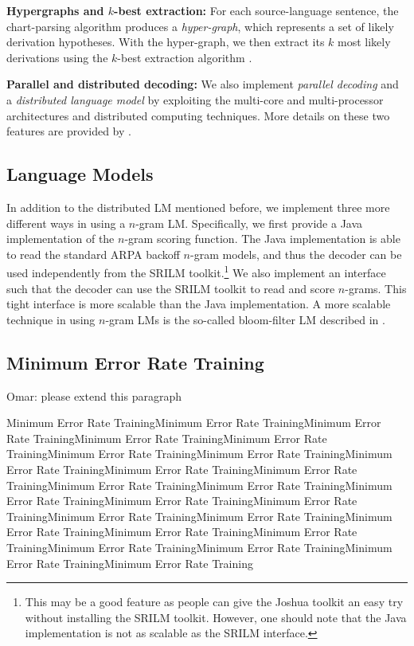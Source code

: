 \documentclass[11pt]{article}
\begin{document}
\textbf{Hypergraphs and $k$-best extraction:}
For each source-language sentence, the chart-parsing algorithm produces a \emph{hyper-graph}, which represents a set of likely derivation hypotheses. With the hyper-graph, we then extract its $k$ most likely derivations using the $k$-best extraction algorithm \cite{liang-kbest}.

\textbf{Parallel and distributed decoding:}
We also implement \emph{parallel decoding} and a \emph{distributed language model} by exploiting the multi-core and multi-processor architectures and distributed computing techniques. More details on these two features are provided by .

\subsection{Language Models}
In addition to the distributed LM mentioned before, we implement three more different ways in using a $n$-gram LM. Specifically, we first provide a Java implementation of the $n$-gram scoring function. The Java implementation is able to read the standard ARPA backoff $n$-gram models, and thus the decoder can be used independently from the SRILM toolkit.\footnote{This may be a good feature as people can give the Joshua toolkit an easy try without installing the SRILM toolkit. However, one should note that the Java implementation is not as scalable as the SRILM interface.} We also implement an interface such that the decoder can use the SRILM toolkit to read and score $n$-grams. This tight interface is more scalable than the Java implementation. A more scalable technique in using $n$-gram LMs is the so-called bloom-filter LM described in .

\subsection{Minimum Error Rate Training}
Omar: please extend this paragraph

Minimum Error Rate TrainingMinimum Error Rate TrainingMinimum Error Rate TrainingMinimum Error Rate TrainingMinimum Error Rate TrainingMinimum Error Rate TrainingMinimum Error Rate TrainingMinimum Error Rate TrainingMinimum Error Rate TrainingMinimum Error Rate TrainingMinimum Error Rate TrainingMinimum Error Rate TrainingMinimum Error Rate TrainingMinimum Error Rate TrainingMinimum Error Rate TrainingMinimum Error Rate TrainingMinimum Error Rate TrainingMinimum Error Rate TrainingMinimum Error Rate TrainingMinimum Error Rate TrainingMinimum Error Rate TrainingMinimum Error Rate TrainingMinimum Error Rate TrainingMinimum Error Rate Training
\end{document}
